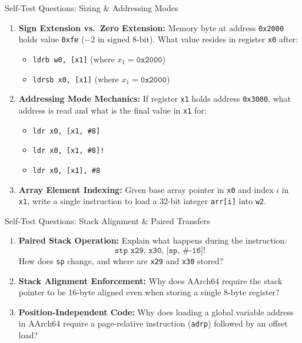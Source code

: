 \documentclass[aspectratio=169,11pt,t]{beamer}
\newcommand{\key}[1]{\textbf{#1}}
\newcommand{\bits}[1]{\texttt{#1}}
\newcommand{\hex}[1]{\texttt{0x#1}}
\newcommand{\code}[1]{\texttt{#1}}
\begin{document}
\begin{frame}{Self-Test Questions: Sizing \& Addressing Modes}

\begin{enumerate}\setlength{\itemsep}{7pt}
  \item \key{Sign Extension vs.\ Zero Extension:} Memory byte at address \hex{2000} holds value \hex{fe} ($-2$ in signed 8-bit). What value resides in register \bits{x0} after:
  \begin{itemize}\setlength{\itemsep}{2pt}
    \item \code{ldrb  w0, [x1]} \quad (where $x_1 = \hex{2000}$)
    \item \code{ldrsb x0, [x1]} \quad (where $x_1 = \hex{2000}$)
  \end{itemize}

  \item \key{Addressing Mode Mechanics:} If register \bits{x1} holds address \hex{3000}, what address is read and what is the final value in \bits{x1} for:
  \begin{itemize}\setlength{\itemsep}{2pt}
    \item \code{ldr x0, [x1, \#8]}
    \item \code{ldr x0, [x1, \#8]!}
    \item \code{ldr x0, [x1], \#8}
  \end{itemize}

  \item \key{Array Element Indexing:} Given base array pointer in \bits{x0} and index $i$ in \bits{x1}, write a single instruction to load a 32-bit integer \texttt{arr[i]} into \bits{w2}.
\end{enumerate}

\end{frame}


\begin{frame}{Self-Test Questions: Stack Alignment \& Paired Transfers}

\begin{enumerate}\setlength{\itemsep}{7pt}
  \item \key{Paired Stack Operation:} Explain what happens during the instruction:
  $$\code{stp x29, x30, [sp, \#-16]!}$$
  How does \bits{sp} change, and where are \bits{x29} and \bits{x30} stored?

  \item \key{Stack Alignment Enforcement:} Why does AArch64 require the stack pointer to be 16-byte aligned even when storing a single 8-byte register?

  \item \key{Position-Independent Code:} Why does loading a global variable address in AArch64 require a page-relative instruction (\code{adrp}) followed by an offset load?
\end{enumerate}

\end{frame}
\end{document}
